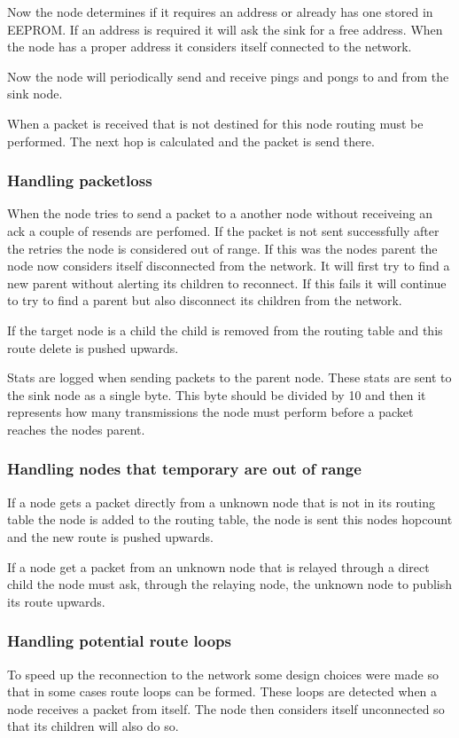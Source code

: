 \documentclass[a4paper,11pt]{article}
\begin{document}
Now the node determines if it requires an address or already has one
stored in EEPROM. If an address is required it will ask the sink for a
free address. When the node has a proper address it considers itself
connected to the network.

Now the node will periodically send and receive pings and pongs to and
from the sink node.

When a packet is received that is not destined for this node routing
must be performed. The next hop is calculated and the packet is send
there.

\subsubsection{Handling packetloss}
When the node tries to send a packet to a another node without
receiveing an ack a couple of resends are perfomed. If the packet is
not sent successfully after the retries the node is considered out of
range. If this was the nodes parent the node now considers itself
disconnected from the network. It will first try to find a new parent
without alerting its children to reconnect. If this fails it will
continue to try to find a parent but also disconnect its children from
the network.

If the target node is a child the child is removed from the routing
table and this route delete is pushed upwards.

Stats are logged when sending packets to the parent node. These stats
are sent to the sink node as a single byte. This byte should be
divided by 10 and then it represents how many transmissions the node
must perform before a packet reaches the nodes parent.

\subsubsection{Handling nodes that temporary are out of range}
If a node gets a packet directly from a unknown node that is not in
its routing table the node is added to the routing table, the node is
sent this nodes hopcount and the new route is pushed upwards.

If a node get a packet from an unknown node that is relayed through a
direct child the node must ask, through the relaying node, the unknown
node to publish its route upwards.

\subsubsection{Handling potential route loops}
To speed up the reconnection to the network some design choices were
made so that in some cases route loops can be formed. These loops are
detected when a node receives a packet from itself. The node then
considers itself unconnected so that its children will also do so.
\end{document}
